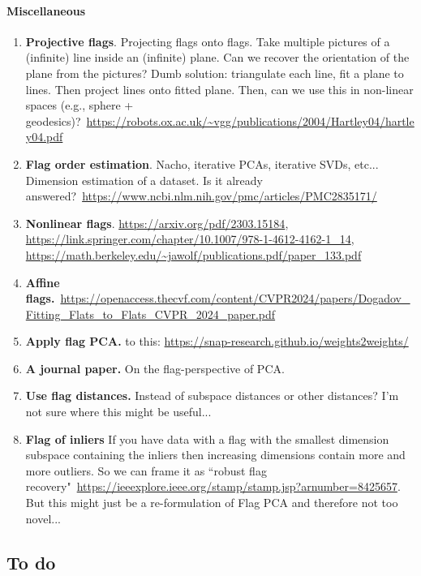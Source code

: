 \paragraph{Miscellaneous}
\begin{enumerate}
    \item \textbf{Projective flags}. Projecting flags onto flags. Take multiple pictures of a (infinite) line inside an (infinite) plane. Can we recover the orientation of the plane from the pictures? Dumb solution: triangulate each line, fit a plane to lines. Then project lines onto fitted plane. Then, can we use this in non-linear spaces (e.g., sphere + geodesics)?~\url{https://robots.ox.ac.uk/~vgg/publications/2004/Hartley04/hartley04.pdf}
    \item \textbf{Flag order estimation}. Nacho, iterative PCAs, iterative SVDs, etc... Dimension estimation of a dataset. Is it already answered?~\url{https://www.ncbi.nlm.nih.gov/pmc/articles/PMC2835171/}
    \item \textbf{Nonlinear flags}. \url{https://arxiv.org/pdf/2303.15184}, \url{https://link.springer.com/chapter/10.1007/978-1-4612-4162-1_14}, \url{https://math.berkeley.edu/~jawolf/publications.pdf/paper_133.pdf}
    \item \textbf{Affine flags.}~\url{https://openaccess.thecvf.com/content/CVPR2024/papers/Dogadov_Fitting_Flats_to_Flats_CVPR_2024_paper.pdf}
    \item \textbf{Apply flag PCA.} to this: \url{https://snap-research.github.io/weights2weights/}
    \item \textbf{A journal paper.} On the flag-perspective of PCA.
    \item \textbf{Use flag distances.} Instead of subspace distances or other distances? I'm not sure where this might be useful...
    \item \textbf{Flag of inliers} If you have data with a flag with the smallest dimension subspace containing the inliers then increasing dimensions contain more and more outliers. So we can frame it as ``robust flag recovery"~\url{https://ieeexplore.ieee.org/stamp/stamp.jsp?arnumber=8425657}. But this might just be a re-formulation of Flag PCA and therefore not too novel...
\end{enumerate}






\subsection{To do}

